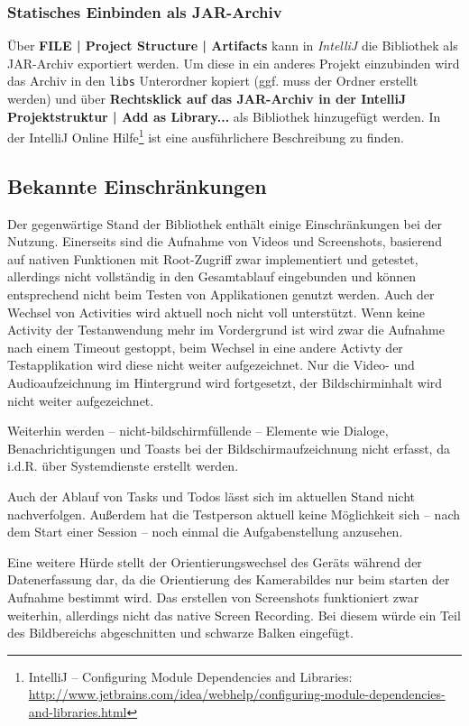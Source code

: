 \subsubsection{Statisches Einbinden als JAR-Archiv}
Über \textbf{FILE | Project Structure | Artifacts} kann in \emph{IntelliJ} die Bibliothek als \ac{JAR}-Archiv exportiert werden.
Um diese in ein anderes Projekt einzubinden wird das Archiv in den \texttt{libs} Unterordner kopiert (ggf. muss der Ordner erstellt werden) und über \textbf{Rechtsklick auf das JAR-Archiv in der IntelliJ Projektstruktur | Add as Library...} als Bibliothek hinzugefügt werden.
In der IntelliJ Online Hilfe\footnote{IntelliJ -- Configuring Module Dependencies and Libraries:  \url{http://www.jetbrains.com/idea/webhelp/configuring-module-dependencies-and-libraries.html}} ist eine ausführlichere Beschreibung zu finden.

\subsection{Bekannte Einschränkungen}
Der gegenwärtige Stand der Bibliothek enthält einige Einschränkungen bei der Nutzung. 
Einerseits sind die Aufnahme von Videos und Screenshots, basierend auf nativen Funktionen mit Root-Zugriff zwar implementiert und getestet, allerdings nicht vollständig in den Gesamtablauf eingebunden und können entsprechend nicht beim Testen von Applikationen genutzt werden.
Auch der Wechsel von Activities wird aktuell noch nicht voll unterstützt.
Wenn keine Activity der Testanwendung mehr im Vordergrund ist wird zwar die Aufnahme nach einem Timeout gestoppt, beim Wechsel in eine andere Activty der Testapplikation wird diese nicht weiter aufgezeichnet.
Nur die Video- und Audioaufzeichnung im Hintergrund wird fortgesetzt, der Bildschirminhalt wird nicht weiter aufgezeichnet.

Weiterhin werden -- nicht-bildschirmfüllende -- Elemente wie Dialoge, Benachrichtigungen und Toasts bei der Bildschirmaufzeichnung nicht erfasst, da i.d.R. über Systemdienste erstellt werden.

Auch der Ablauf von Tasks und Todos lässt sich im aktuellen Stand nicht nachverfolgen.
Außerdem hat die Testperson aktuell keine Möglichkeit sich -- nach dem Start einer Session -- noch einmal die Aufgabenstellung anzusehen.

Eine weitere Hürde stellt der Orientierungswechsel des Geräts während der Datenerfassung dar, da die Orientierung des Kamerabildes nur beim starten der Aufnahme bestimmt wird.
Das erstellen von Screenshots funktioniert zwar weiterhin, allerdings nicht das native Screen Recording.
Bei diesem würde ein Teil des Bildbereichs abgeschnitten und schwarze Balken eingefügt.
 
